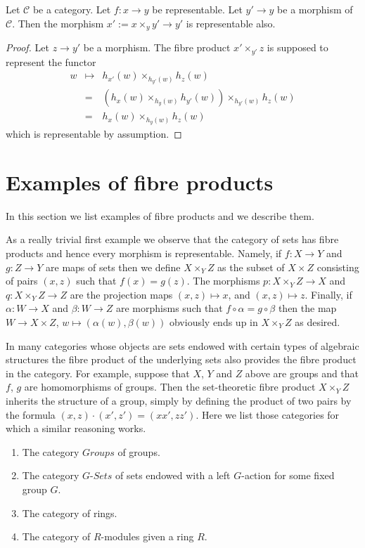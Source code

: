 \begin{lemma}
\label{lemma-base-change-representable}
Let $\mathcal{C}$ be a category.
Let $f : x \to y$ be representable.
Let $y' \to y$ be a morphism of $\mathcal{C}$.
Then the morphism $x' := x \times_y y' \to y'$ is representable also.
\end{lemma}

\begin{proof}
Let $z \to y'$ be a morphism. The fibre product
$x' \times_{y'} z$ is supposed to represent the
functor
\begin{eqnarray*}
w & \mapsto & h_{x'}(w)\times_{h_{y'}(w)} h_z(w) \\
& = & (h_x(w) \times_{h_y(w)} h_{y'}(w)) \times_{h_{y'}(w)} h_z(w) \\
& = & h_x(w) \times_{h_y(w)} h_z(w)
\end{eqnarray*}
which is representable by assumption.
\end{proof}

\section{Examples of fibre products}
\label{section-example-fibre-products}

\noindent
In this section we list examples of fibre products and
we describe them.

\medskip\noindent
As a really trivial first example we observe
that the category of sets has fibre products and hence every
morphism is representable. Namely, if $f : X \to Y$
and $g : Z \to Y$ are maps of sets then we define
$X \times_Y Z$ as the subset of $X \times Z$ consisting
of pairs $(x, z)$ such that $f(x) = g(z)$. The morphisms
$p : X \times_Y Z \to X$ and $q : X \times_Y Z \to Z$ are
the projection maps $(x, z) \mapsto x$, and $(x, z) \mapsto z$.
Finally, if $\alpha : W \to X$ and $\beta : W \to Z$
are morphisms such that $f \circ \alpha = g \circ \beta$
then the map $W \to X \times Z$, $w\mapsto (\alpha(w), \beta(w))$
obviously ends up in $X \times_Y Z$ as desired.

\medskip\noindent
In many categories whose objects are sets endowed with certain types of
algebraic structures the fibre product of the underlying sets also
provides the fibre product in the category. For example, suppose
that $X$, $Y$ and $Z$ above are groups and that $f$, $g$ are
homomorphisms of groups. Then the set-theoretic fibre product
$X \times_Y Z$ inherits the structure of a group, simply by
defining the product of two pairs by the formula
$(x, z) \cdot (x', z') = (xx', zz')$. Here we list those categories
for which a similar reasoning works.
\begin{enumerate}
\item The category $\textit{Groups}$ of groups.
\item The category $G\textit{-Sets}$ of sets
endowed with a left $G$-action for some fixed group $G$.
\item The category of rings.
\item The category of $R$-modules given a ring $R$.
\end{enumerate}

